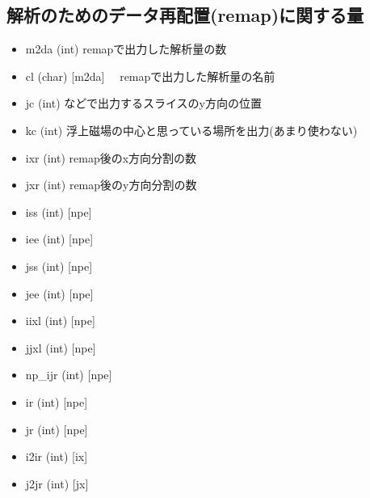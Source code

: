 \documentclass[letterpaper,10pt,dvipdfmx,report]{sphinxmanual}
\begin{document}
\subsection{解析のためのデータ再配置(remap)に関する量}
\label{\detokenize{notation:remap}}\begin{itemize}
\item {} 
m2da (int) \sphinxhyphen{}\sphinxhyphen{} remapで出力した解析量の数

\item {} 
cl (char) {[}m2da{]} \sphinxhyphen{}\sphinxhyphen{}　remapで出力した解析量の名前

\item {} 
jc (int) \sphinxhyphen{}\sphinxhyphen{}  などで出力するスライスのy方向の位置

\item {} 
kc (int) \sphinxhyphen{}\sphinxhyphen{} 浮上磁場の中心と思っている場所を出力(あまり使わない)

\item {} 
ixr (int) \sphinxhyphen{}\sphinxhyphen{} remap後のx方向分割の数

\item {} 
jxr (int) \sphinxhyphen{}\sphinxhyphen{} remap後のy方向分割の数

\item {} 
iss (int) {[}npe{]} \sphinxhyphen{}\sphinxhyphen{}

\item {} 
iee (int) {[}npe{]} \sphinxhyphen{}\sphinxhyphen{}

\item {} 
jss (int) {[}npe{]} \sphinxhyphen{}\sphinxhyphen{}

\item {} 
jee (int) {[}npe{]} \sphinxhyphen{}\sphinxhyphen{}

\item {} 
iixl (int) {[}npe{]} \sphinxhyphen{}\sphinxhyphen{}

\item {} 
jjxl (int) {[}npe{]} \sphinxhyphen{}\sphinxhyphen{}

\item {} 
np\_ijr (int) {[}npe{]} \sphinxhyphen{}\sphinxhyphen{}

\item {} 
ir (int) {[}npe{]} \sphinxhyphen{}\sphinxhyphen{}

\item {} 
jr (int) {[}npe{]} \sphinxhyphen{}\sphinxhyphen{}

\item {} 
i2ir (int) {[}ix{]} \sphinxhyphen{}\sphinxhyphen{}

\item {} 
j2jr (int) {[}jx{]} \sphinxhyphen{}\sphinxhyphen{}

\end{itemize}
\end{document}
